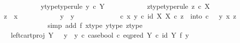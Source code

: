 \begin{isabellebody}
\ \ \ \ \ \ \ \ \ \ \isamarkupfalse%
\ y{\isacharunderscore}{\kern0pt}type{\isacharbrackleft}{\kern0pt}type{\isacharunderscore}{\kern0pt}rule{\isacharbrackright}{\kern0pt}{\isacharcolon}{\kern0pt}\ {\isachardoublequoteopen}y\ {\isasymin}\isactrlsub c\ Y{\isachardoublequoteclose}\isanewline
\ \ \ \ \ \ \ \ \ \ \isamarkupfalse%
\ z{\isacharunderscore}{\kern0pt}type{\isacharbrackleft}{\kern0pt}type{\isacharunderscore}{\kern0pt}rule{\isacharbrackright}{\kern0pt}{\isacharcolon}{\kern0pt}\ {\isachardoublequoteopen}z\ {\isasymin}\isactrlsub c\ X{\isachardoublequoteclose}\isanewline
\ \ \ \ \ \ \ \ \ \ \isamarkupfalse%
\ {\isachardoublequoteopen}z\ {\isasymnoteq}\ x{\isachardoublequoteclose}\isanewline
\ \ \ \ \ \ \ \ \ \ \isamarkupfalse%
\ {\isachardoublequoteopen}y\ {\isasymnoteq}\ y{}{\isachardoublequoteclose}\isanewline
\ \ \ \ \ \ \ \ \ \ \isamarkupfalse%
\ {\isachardoublequoteopen}{\isacharparenleft}{\kern0pt}{\isasymTheta}\ {\isasymcirc}\isactrlsub c\ {\isasymlangle}x{\isacharcomma}{\kern0pt}\ y{\isasymrangle}{\isacharparenright}{\kern0pt}\isactrlsup {\isasymflat}\ {\isasymcirc}\isactrlsub c\ {\isasymlangle}id\ X{\isacharcomma}{\kern0pt}\ {\isasymbeta}\isactrlbsub X\isactrlesub {\isasymrangle}\ {\isasymcirc}\isactrlsub c\ z\ {\isacharequal}{\kern0pt}\ into\ {\isasymcirc}\isactrlsub c\ \ \ {\isasymlangle}y{\isacharcomma}{\kern0pt}\ {\isasymlangle}x{\isacharcomma}{\kern0pt}\ z{\isasymrangle}{\isasymrangle}{\isachardoublequoteclose}\isanewline
\ \ \ \ \ \ \ \ \ \ \ \ \isamarkupfalse%
\ {\isacharparenleft}{\kern0pt}simp\ add{\isacharcolon}{\kern0pt}\ f{}\ x{\isacharunderscore}{\kern0pt}type\ y{\isacharunderscore}{\kern0pt}type\ z{\isacharunderscore}{\kern0pt}type{\isacharparenright}{\kern0pt}\isanewline
\ \ \ \ \ \ \ \ \ \ \isamarkupfalse%
\ \isamarkupfalse%
\ {\isachardoublequoteopen}{\isachardot}{\kern0pt}{\isachardot}{\kern0pt}{\isachardot}{\kern0pt}\ {\isacharequal}{\kern0pt}\ {\isacharparenleft}{\kern0pt}left{\isacharunderscore}{\kern0pt}cart{\isacharunderscore}{\kern0pt}proj\ Y\ {\isasymone}\ {\isasymamalg}\ {\isacharparenleft}{\kern0pt}{\isacharparenleft}{\kern0pt}y{}\ {\isasymamalg}\ y{}{\isacharparenright}{\kern0pt}\ {\isasymcirc}\isactrlsub c\ case{\isacharunderscore}{\kern0pt}bool\ {\isasymcirc}\isactrlsub c\ eq{\isacharunderscore}{\kern0pt}pred\ Y\ {\isasymcirc}\isactrlsub c\ {\isacharparenleft}{\kern0pt}id\ Y\ {\isasymtimes}\isactrlsub f\ y{}{\isacharparenright}{\kern0pt}{\isacharparenright}{\kern0pt}{\isacharparenright}{\kern0pt}\isanewline

\end{isabellebody}
